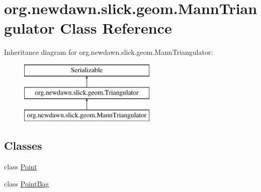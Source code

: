 \hypertarget{classorg_1_1newdawn_1_1slick_1_1geom_1_1_mann_triangulator}{}\section{org.\+newdawn.\+slick.\+geom.\+Mann\+Triangulator Class Reference}
\label{classorg_1_1newdawn_1_1slick_1_1geom_1_1_mann_triangulator}
Inheritance diagram for org.\+newdawn.\+slick.\+geom.\+Mann\+Triangulator\+:\begin{figure}[H]
\begin{center}
\leavevmode
\includegraphics[height=3.000000cm]{classorg_1_1newdawn_1_1slick_1_1geom_1_1_mann_triangulator}
\end{center}
\end{figure}
\subsection*{Classes}
\begin{DoxyCompactItemize}
\item 
class \mbox{\hyperlink{classorg_1_1newdawn_1_1slick_1_1geom_1_1_mann_triangulator_1_1_point}{Point}}
\item 
class \mbox{\hyperlink{classorg_1_1newdawn_1_1slick_1_1geom_1_1_mann_triangulator_1_1_point_bag}{Point\+Bag}}
\end{DoxyCompactItemize}
